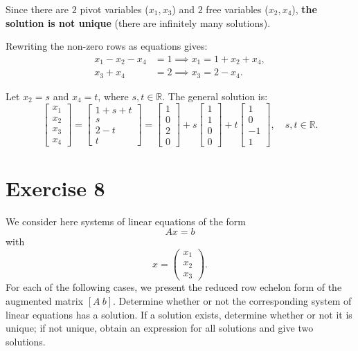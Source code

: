 \documentclass[12pt,a4paper]{article}
\begin{document}
Since there are $2$ pivot variables ($x_1, x_3$) and $2$ free variables ($x_2, x_4$), \textbf{the solution is not unique} (there are infinitely many solutions).

Rewriting the non-zero rows as equations gives:
\[
\begin{aligned}
	x_1 - x_2 - x_4 &= 1 \implies x_1 = 1 + x_2 + x_4, \\
	x_3 + x_4 &= 2 \implies x_3 = 2 - x_4.
\end{aligned}
\]

Let $x_2 = s$ and $x_4 = t$, where $s, t \in \mathbb{R}$. The general solution is:
\[
\begin{bmatrix} x_1 \\ x_2 \\ x_3 \\ x_4 \end{bmatrix} 
= \begin{bmatrix} 1 + s + t \\ s \\ 2 - t \\ t \end{bmatrix} 
= \begin{bmatrix} 1 \\ 0 \\ 2 \\ 0 \end{bmatrix} 
+ s \begin{bmatrix} 1 \\ 1 \\ 0 \\ 0 \end{bmatrix} 
+ t \begin{bmatrix} 1 \\ 0 \\ -1 \\ 1 \end{bmatrix}, \quad s, t \in \mathbb{R}.
\]

\par\nopagebreak\vspace{3cm}

\Needspace{14cm}
\section*{Exercise 8}
We consider here systems of linear equations of the form
\[
Ax=b
\]
with
\[
x=\begin{pmatrix}x_1\\x_2\\x_3\end{pmatrix}.
\]
For each of the following cases, we present the reduced row echelon form of the
augmented matrix $[A\ b]$. Determine whether or not the corresponding system of
linear equations has a solution. If a solution exists, determine whether or not
it is unique; if not unique, obtain an expression for all solutions and give two
solutions.
\end{document}
